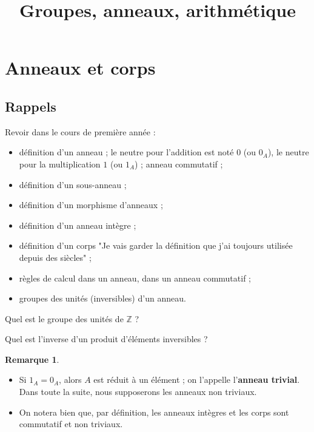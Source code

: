 \documentclass[french]{article}
\title{Groupes, anneaux, arithmétique}
\date{}
\newcommand{\Z}{\mathbb{Z}}
\theoremstyle{plain}
\theoremstyle{definition}
\newtheorem*{rmq}{Remarque}
\theoremstyle{remark}
\begin{document}
\tableofcontents

\newpage
\maketitle

\section{Anneaux et corps}


\subsection{Rappels}

Revoir dans le cours de première année :
\begin{itemize}
	\item définition d'un anneau ; le neutre pour l'addition est noté $0$ (ou $0_A$), le neutre pour la multiplication $1$ (ou $1_A$) ; anneau commutatif ;
	\item définition d'un sous-anneau ;
	\item définition d'un morphisme d'anneaux ;
	\item définition d'un anneau intègre ;
	\item définition d'un corps "Je vais garder la définition que j'ai toujours utilisée depuis des siècles" ;
	\item règles de calcul dans un anneau, dans un anneau commutatif ;
	\item groupes des unités (inversibles) d'un anneau.
\end{itemize}

\begin{exo}
	Quel est le groupe des unités de $\Z$ ?
\end{exo}

\begin{exo}
	Quel est l'inverse d'un produit d'éléments inversibles ?
\end{exo}

\begin{rmq}
	\begin{itemize}
		\item Si $1_A=0_A$, alors $A$ est réduit à un élément ; on l'appelle l'\textbf{anneau trivial}. Dans toute la suite, nous supposerons les anneaux non triviaux.
		\item On notera bien que, par définition, les anneaux intègres et les corps sont commutatif et non triviaux.
	\end{itemize}
\end{rmq}
\end{document}
